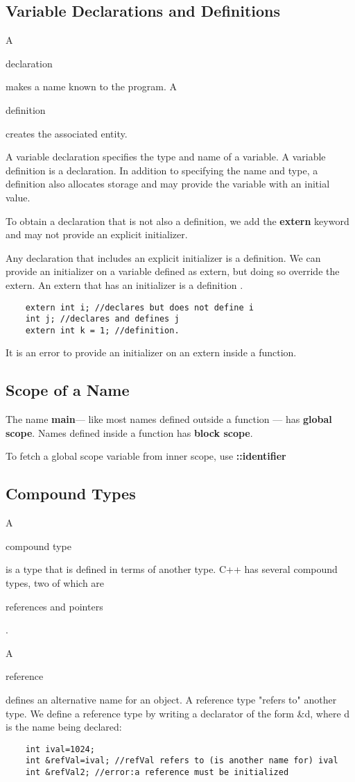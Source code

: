 \documentclass[UTF8]{ctexart}
\newcommand \qd[1] {\begin{qds} {#1} \end{qds}}
\begin{document}
\subsection{Variable Declarations and Definitions}

A \qd{declaration} makes a name known to the program. A \qd{definition} creates the associated entity. 

A variable declaration specifies the type and name of a variable. A variable definition is a declaration. In addition to specifying the name and type, a definition also allocates storage and may provide the variable with an initial value.

To obtain a declaration that is not also a definition, we add the \textbf{extern} keyword and may not provide an explicit initializer.

Any declaration that includes an explicit initializer is a definition. We can provide an initializer on a variable defined as extern, but doing so override the extern. An extern that has an initializer is a definition .
\begin{lstlisting}
	extern int i; //declares but does not define i
	int j; //declares and defines j
	extern int k = 1; //definition.
\end{lstlisting}

It is an error to provide an initializer on an extern inside a function.

\subsection{Scope of a Name}

The name \textbf{main}--- like most names defined outside a function --- has \textbf{global scope}.
Names defined inside a function has \textbf{block scope}.

To fetch a global scope variable from inner scope, use \textbf{::identifier}

\subsection{Compound Types}
A \qd{compound type} is a type that is defined in terms of another type. C++ has several compound types, two of which are \qd{references and pointers}.

A \qd{reference} defines an alternative name for an object. A reference type "refers to" another type. We define a reference type by writing a declarator of the form \&d, where d is the name being declared:
\begin{lstlisting}
	int ival=1024;
	int &refVal=ival; //refVal refers to (is another name for) ival
	int &refVal2; //error:a reference must be initialized
\end{lstlisting}
\end{document}

